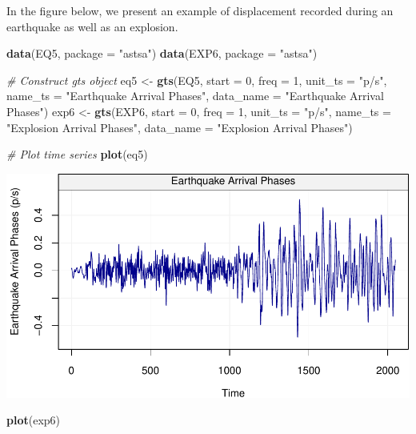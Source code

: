 \documentclass[]{book}
\newenvironment{Shaded}{\begin{snugshade}}{\end{snugshade}}
\newcommand{\CommentTok}[1]{\textcolor[rgb]{0.56,0.35,0.01}{\textit{#1}}}
\newcommand{\DataTypeTok}[1]{\textcolor[rgb]{0.13,0.29,0.53}{#1}}
\newcommand{\DecValTok}[1]{\textcolor[rgb]{0.00,0.00,0.81}{#1}}
\newcommand{\KeywordTok}[1]{\textcolor[rgb]{0.13,0.29,0.53}{\textbf{#1}}}
\newcommand{\NormalTok}[1]{#1}
\newcommand{\StringTok}[1]{\textcolor[rgb]{0.31,0.60,0.02}{#1}}
\theoremstyle{definition}
\theoremstyle{definition}
\theoremstyle{definition}
\theoremstyle{remark}
\let\BeginKnitrBlock\begin \let\EndKnitrBlock\end
\begin{document}
\BeginKnitrBlock{example}
\protect\hypertarget{exm:earthquake}{}{\label{exm:earthquake} }In the figure
below, we present an example of displacement recorded during an
earthquake as well as an explosion.
\EndKnitrBlock{example}

\begin{Shaded}
\begin{Highlighting}[]
\KeywordTok{data}\NormalTok{(EQ5, }\DataTypeTok{package =} \StringTok{"astsa"}\NormalTok{)}
\KeywordTok{data}\NormalTok{(EXP6, }\DataTypeTok{package =} \StringTok{"astsa"}\NormalTok{)}

\CommentTok{# Construct gts object}
\NormalTok{eq5 <-}\StringTok{ }\KeywordTok{gts}\NormalTok{(EQ5, }\DataTypeTok{start =} \DecValTok{0}\NormalTok{, }\DataTypeTok{freq =} \DecValTok{1}\NormalTok{, }\DataTypeTok{unit_ts =} \StringTok{"p/s"}\NormalTok{, }\DataTypeTok{name_ts =} \StringTok{"Earthquake Arrival Phases"}\NormalTok{, }\DataTypeTok{data_name =} \StringTok{"Earthquake Arrival Phases"}\NormalTok{)}
\NormalTok{exp6 <-}\StringTok{ }\KeywordTok{gts}\NormalTok{(EXP6, }\DataTypeTok{start =} \DecValTok{0}\NormalTok{, }\DataTypeTok{freq =} \DecValTok{1}\NormalTok{, }\DataTypeTok{unit_ts =} \StringTok{"p/s"}\NormalTok{, }\DataTypeTok{name_ts =} \StringTok{"Explosion Arrival Phases"}\NormalTok{, }\DataTypeTok{data_name =} \StringTok{"Explosion Arrival Phases"}\NormalTok{)}

\CommentTok{# Plot time series}
\KeywordTok{plot}\NormalTok{(eq5)}
\end{Highlighting}
\end{Shaded}

\begin{center}\includegraphics{ts_files/figure-latex/example_EQ-1} \end{center}

\begin{Shaded}
\begin{Highlighting}[]
\KeywordTok{plot}\NormalTok{(exp6)}
\end{Highlighting}
\end{Shaded}
\end{document}
